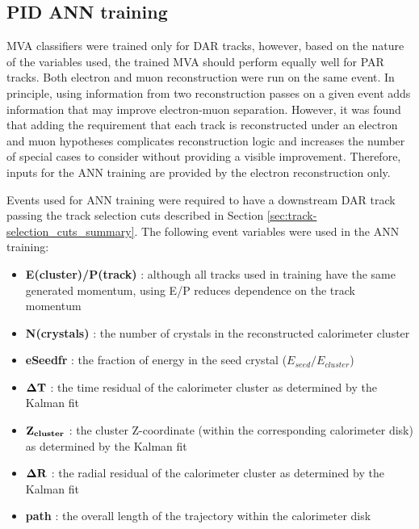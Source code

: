 \subsection {PID ANN training }
\label{sec:mumem_pid_ann_training}

MVA classifiers were trained only for DAR tracks, however, based on the nature of 
the variables used, the trained MVA should perform equally well for PAR tracks.
%
Both electron and muon reconstruction were run on the same event. 
In principle, using information from two reconstruction passes on a given event adds information that may improve electron-muon separation.
However, it was found that adding  the requirement that each track is reconstructed under
an electron and muon hypotheses complicates reconstruction logic and increases
the number of special cases to consider without providing a visible improvement. 
Therefore, inputs for the ANN training are provided by the electron reconstruction only.

Events used for ANN training were required to have a downstream DAR track passing
the track selection cuts described in Section \ref{sec:track-selection_cuts_summary}.
%
The following event variables were used in the ANN training:

\begin{itemize}
\item 
  {\bf E(cluster)/P(track)} : although all tracks used in training have the same generated momentum,
  using E/P reduces dependence on the track momentum 
\item 
  {\bf N(crystals)} : the number of crystals in the reconstructed calorimeter cluster
\item 
  {\bf eSeedfr} : the fraction of energy in the seed crystal ($E_{seed}/E_{cluster}$)
\item 
  {$\bf \Delta T$} : the time residual of the calorimeter cluster as determined by the Kalman fit
\item 
  {$\bf Z_{cluster}$} : the cluster Z-coordinate (within the corresponding calorimeter disk) as determined by the Kalman fit
\item 
  {$\bf \Delta R$} : the radial residual of the calorimeter cluster as determined by the Kalman fit
\item 
  {\bf path} : the overall length of the trajectory within the calorimeter disk
\end{itemize}

